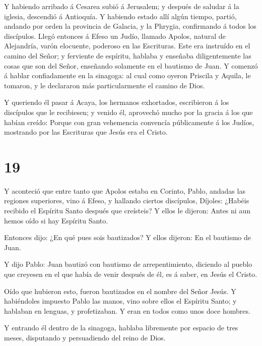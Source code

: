  Y habiendo arribado á Cesarea subió á Jerusalem; y después
de saludar á la iglesia, descendió á Antioquía.  Y habiendo
estado allí algún tiempo, partió, andando por orden la provincia de
Galacia, y la Phrygia, confirmando á todos los discípulos. 
Llegó entonces á Efeso un Judío, llamado Apolos, natural de Alejandría,
varón elocuente, poderoso en las Escrituras.  Este era
instruído en el camino del Señor; y ferviente de espíritu, hablaba y
enseñaba diligentemente las cosas que son del Señor, enseñando solamente
en el bautismo de Juan.  Y comenzó á hablar confiadamente
en la sinagoga: al cual como oyeron Priscila y Aquila, le tomaron, y le
declararon más particularmente el camino de Dios.

 Y queriendo él pasar á Acaya, los hermanos exhortados,
escribieron á los discípulos que le recibiesen; y venido él, aprovechó
mucho por la gracia á los que habían creído:  Porque con
gran vehemencia convencía públicamente á los Judíos, mostrando por las
Escrituras que Jesús era el Cristo.

\hypertarget{section-18}{%
\section{19}\label{section-18}}

 Y aconteció que entre tanto que Apolos estaba en Corinto,
Pablo, andadas las regiones superiores, vino á Efeso, y hallando ciertos
discípulos,  Díjoles: ¿Habéis recibido el Espíritu Santo
después que creísteis? Y ellos le dijeron: Antes ni aun hemos oído si
hay Espíritu Santo.

 Entonces dijo: ¿En qué pues sois bautizados? Y ellos
dijeron: En el bautismo de Juan.

 Y dijo Pablo: Juan bautizó con bautismo de arrepentimiento,
diciendo al pueblo que creyesen en el que había de venir después de él,
es á saber, en Jesús el Cristo.

 Oído que hubieron esto, fueron bautizados en el nombre del
Señor Jesús.  Y habiéndoles impuesto Pablo las manos, vino
sobre ellos el Espíritu Santo; y hablaban en lenguas, y profetizaban.
 Y eran en todos como unos doce hombres.

 Y entrando él dentro de la sinagoga, hablaba libremente por
espacio de tres meses, disputando y persuadiendo del reino de Dios.

